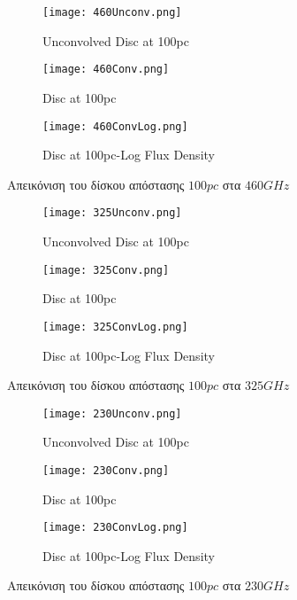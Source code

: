 \begin{figure}[h]
\centering
 \begin{subfigure}{0.33\textwidth}
  \centering
  \texttt{[image: 460Unconv.png]}
  \caption{{\en Unconvolved Disc at 100pc}}\label{fig:460gHzUnconvolved}
 \end{subfigure}\hfill
 \begin{subfigure}{0.33\textwidth}
  \centering
  \texttt{[image: 460Conv.png]}
  \caption{{\en Disc at 100pc}}\label{fig:460gHzCOnvolved}
 \end{subfigure}\hfill
 \begin{subfigure}{0.33\textwidth}
  \centering
  \texttt{[image: 460ConvLog.png]}
  \caption{{\en Disc at 100pc-Log Flux Density}}\label{fig:Log460gHzCOnvolved}
 \end{subfigure}\hfill
  \caption{Απεικόνιση του δίσκου απόστασης $100pc$ στα $460GHz$}
\medskip
\centering
 \begin{subfigure}{0.33\textwidth}
  \centering
  \texttt{[image: 325Unconv.png]}
  \caption{{\en Unconvolved Disc at 100pc}}\label{fig:325gHzUnconvolved}
 \end{subfigure}\hfill
 \begin{subfigure}{0.33\textwidth}
  \centering
  \texttt{[image: 325Conv.png]}
  \caption{{\en Disc at 100pc}}\label{fig:325gHzCOnvolved}
 \end{subfigure}\hfill
 \begin{subfigure}{0.33\textwidth}
  \centering
  \texttt{[image: 325ConvLog.png]}
  \caption{{\en Disc at 100pc-Log Flux Density}}\label{fig:Log325gHzCOnvolved}
 \end{subfigure}\hfill
  \caption{Απεικόνιση του δίσκου απόστασης $100pc$ στα $325GHz$}
  \medskip
\centering
 \begin{subfigure}{0.33\textwidth}
  \centering
  \texttt{[image: 230Unconv.png]}
  \caption{{\en Unconvolved Disc at 100pc}}\label{fig:230gHzUnconvolved}
 \end{subfigure}\hfill
 \begin{subfigure}{0.33\textwidth}
  \centering
  \texttt{[image: 230Conv.png]}
  \caption{{\en Disc at 100pc}}\label{fig:230gHzCOnvolved}
 \end{subfigure}\hfill
 \begin{subfigure}{0.33\textwidth}
  \centering
  \texttt{[image: 230ConvLog.png]}
  \caption{{\en Disc at 100pc-Log Flux Density}}\label{fig:Log230gHzCOnvolved}
 \end{subfigure}\hfill
  \caption{Απεικόνιση του δίσκου απόστασης $100pc$ στα $230GHz$}
\end{figure}


